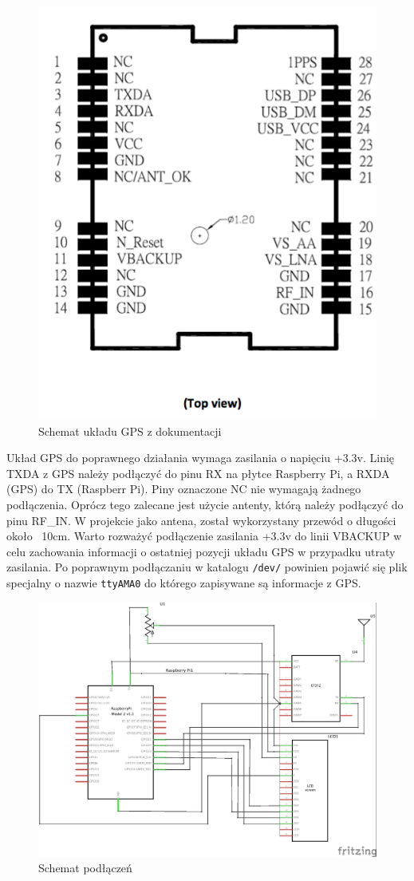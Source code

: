 \documentclass{article}
\begin{document}
			    \begin{figure}[H]
			    	\centering
			    	\includegraphics[width=0.6\linewidth]{gps}
			    	\caption{Schemat układu GPS z dokumentacji}
			    \end{figure}
			    	    Układ GPS do poprawnego działania wymaga zasilania o napięciu +3.3v. Linię TXDA z GPS należy podłączyć do pinu RX na płytce Raspberry Pi, a RXDA (GPS) do TX (Raspberr Pi). Piny oznaczone NC nie wymagają żadnego podłączenia. Oprócz tego zalecane jest użycie antenty, którą należy podłączyć do pinu RF\_IN. W projekcie jako antena, został wykorzystany przewód o długości około ~10cm. Warto rozważyć podłączenie zasilania +3.3v do linii VBACKUP w celu zachowania informacji o ostatniej pozycji układu GPS w przypadku utraty zasilania. Po poprawnym podłączaniu w katalogu \texttt{/dev/} powinien pojawić się plik specjalny o nazwie \texttt{ttyAMA0} do którego zapisywane są informacje z GPS.
		
			\begin{figure}[H]
				\centering
				\includegraphics[width=0.9\linewidth]{schemat-podlaczenia_schem.jpg}
				\caption{Schemat podłączeń}
			\end{figure}
			
\end{document}
